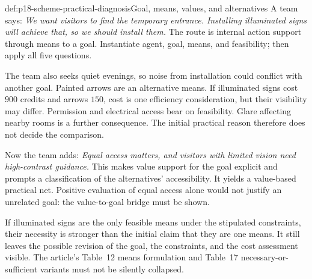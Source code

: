 \begin{hbexample}{def:p18-scheme-practical-diagnosis}{Goal, means, values, and alternatives}
A team says: \emph{We want visitors to find the temporary entrance.
Installing illuminated signs will achieve that, so we should install
them.} The route is internal action support through means to a goal.
Instantiate agent, goal, means, and feasibility; then apply all five
questions.

The team also seeks quiet evenings, so noise from installation could
conflict with another goal. Painted arrows are an alternative means.
If illuminated signs cost \(900\) credits and arrows \(150\), cost is
one efficiency consideration, but their visibility may differ.
Permission and electrical access bear on feasibility.
Glare affecting nearby rooms is a further consequence.
The initial practical reason therefore does not decide the comparison.

Now the team adds: \emph{Equal access matters, and visitors with limited
vision need high-contrast guidance.} This makes value support for
the goal explicit and prompts a classification of the alternatives'
accessibility. It yields a value-based practical net.
Positive evaluation of equal access alone would not justify an
unrelated goal: the value-to-goal bridge must be shown.

If illuminated signs are the only feasible means under the stipulated
constraints, their necessity is stronger than the initial claim that
they are one means. It still leaves the possible revision of the
goal, the constraints, and the cost assessment visible.
The article's Table~12 means formulation and Table~17
necessary-or-sufficient variants must not be silently collapsed.
\end{hbexample}

